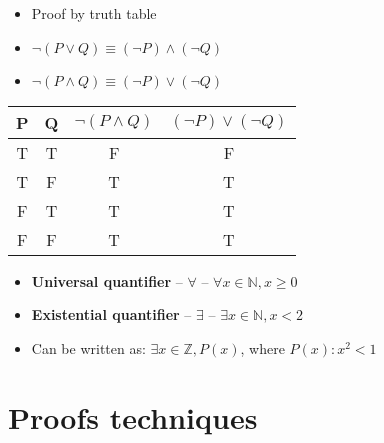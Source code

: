 \documentclass[english,10pt,a4paper]{article}
\begin{document}
\begin{theo} 
\begin{minipage}{0.5\linewidth}
\begin{itemize}
\item Proof by truth table
\item $\neg (P \vee Q) \equiv (\neg P) \wedge (\neg Q)$
\item $\neg (P \wedge Q) \equiv (\neg P) \vee (\neg Q)$
\end{itemize}

\end{minipage}
\hspace{0.1cm}
\begin{minipage}{0.3\linewidth}

\begin{tabular}{cc|c|c}
P & Q & $\neg (P \wedge Q)$ & $(\neg P) \vee (\neg Q)$\\ 
\hline
T & T & F & F\\ 
T & F & T & T\\
F & T & T & T\\
F & F & T & T
\end{tabular} 
\end{minipage}
\end{theo}

\begin{theo}[Quantifiers] 
\begin{itemize}
\item \textbf{Universal quantifier} -- $\forall$ -- $\forall x \in \mathbb{N}, x \geq 0$
\item \textbf{Existential quantifier} -- $\exists$ -- $\exists x \in \mathbb{N}, x < 2$
\item Can be written as:  $\exists x \in \mathbb{Z}, P(x)$, where $P(x): x^2 < 1$
\end{itemize}
\end{theo}

\newpage
\section{Proofs techniques}
\end{document}
